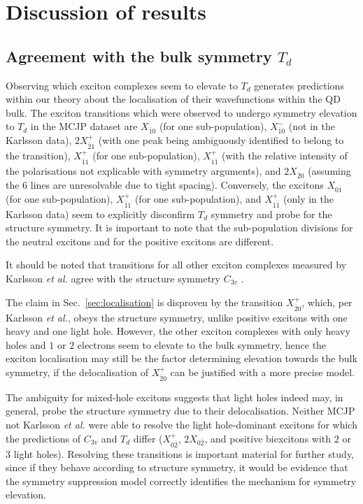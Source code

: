 \section{Discussion of results}

\subsection{Agreement with the bulk symmetry $T_d$}
Observing which exciton complexes seem to elevate to $T_d$ generates predictions within our theory about the localisation of their wavefunctions within the QD bulk. The exciton transitions which were observed to undergo symmetry elevation to $T_d$ in the MCJP dataset are $X_{\bar{1}0}$ (for one sub-population), $X^-_{\bar{1}0}$ (not in the Karlsson data), $2X^+_{\bar{2}1}$ (with one peak being ambiguously identified to belong to the transition), $X^+_{\bar{1}1}$ (for one sub-population),  $X^+_{1\bar{1}}$ (with the relative intensity of the polarisations not explicable with symmetry arguments), and $2X_{\bar{2}0}$ (assuming the $6$ lines are unresolvable due to tight spacing). Conversely, the excitons $X_{0\bar{1}}$ (for one sub-population), $X^+_{\bar{1}1}$ (for one sub-population), and $X^+_{1\bar{1}}$ (only in the Karlsson data) seem to explicitly disconfirm $T_d$ symmetry and probe for the structure symmetry. It is important to note that the sub-population divisions for the neutral excitons and for the positive excitons are different.

It should be noted that transitions for all other exciton complexes measured by Karlsson \textit{et al.} agree with the structure symmetry $C_{3v}$ \cite[p.~20]{karlsson}.

The claim in Sec.~\ref{sec:localisation} is disproven by the transition $X^+_{\bar{2}0}$, which, per Karlsson \textit{et al.}, obeys the structure symmetry, unlike positive excitons with one heavy and one light hole. However, the other exciton complexes with only heavy holes and $1$ or $2$ electrons seem to elevate to the bulk symmetry, hence the exciton localisation may still be the factor determining elevation towards the bulk symmetry, if the delocalisation of $X^+_{\bar{2}0}$ can be justified with a more precise model.

The ambiguity for mixed-hole excitons suggests that light holes indeed may, in general, probe the structure symmetry due to their delocalisation. Neither MCJP not Karlsson \textit{et al.} were able to resolve the light hole-dominant excitons for which the predictions of $C_{3v}$ and $T_d$ differ ($X^+_{0\bar{2}}$, $2X_{0\bar{2}}$, and positive biexcitons with $2$ or $3$ light holes). Resolving these transitions is important material for further study, since if they behave according to structure symmetry, it would be evidence that the symmetry suppression model correctly identifies the mechanism for symmetry elevation.

